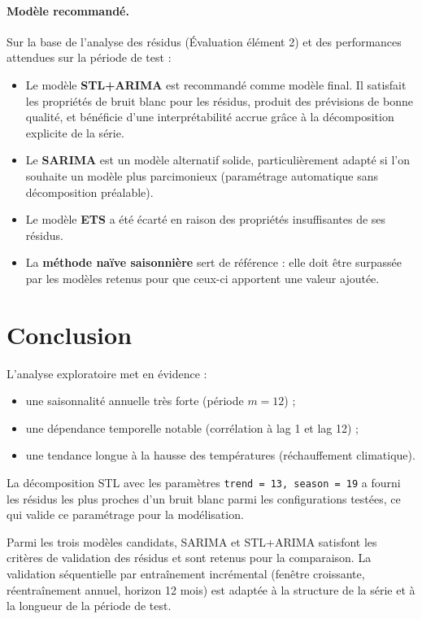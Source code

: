 \documentclass[12pt,a4paper]{article}
\begin{document}
\paragraph{Modèle recommandé.}
Sur la base de l'analyse des résidus (Évaluation élément 2) et des performances attendues sur la période de test :

\begin{itemize}
    \item Le modèle \textbf{STL+ARIMA} est recommandé comme modèle final. Il satisfait les propriétés de bruit blanc pour les résidus, produit des prévisions de bonne qualité, et bénéficie d'une interprétabilité accrue grâce à la décomposition explicite de la série.
    \item Le \textbf{SARIMA} est un modèle alternatif solide, particulièrement adapté si l'on souhaite un modèle plus parcimonieux (paramétrage automatique sans décomposition préalable).
    \item Le modèle \textbf{ETS} a été écarté en raison des propriétés insuffisantes de ses résidus.
    \item La \textbf{méthode naïve saisonnière} sert de référence : elle doit être surpassée par les modèles retenus pour que ceux-ci apportent une valeur ajoutée.
\end{itemize}

\section{Conclusion}

L'analyse exploratoire met en évidence :
\begin{itemize}
    \item une saisonnalité annuelle très forte (période $m = 12$) ;
    \item une dépendance temporelle notable (corrélation à lag 1 et lag 12) ;
    \item une tendance longue à la hausse des températures (réchauffement climatique).
\end{itemize}

La décomposition STL avec les paramètres \texttt{trend = 13, season = 19} a fourni les résidus les plus proches d'un bruit blanc parmi les configurations testées, ce qui valide ce paramétrage pour la modélisation.

Parmi les trois modèles candidats, SARIMA et STL+ARIMA satisfont les critères de validation des résidus et sont retenus pour la comparaison. La validation séquentielle par entraînement incrémental (fenêtre croissante, réentraînement annuel, horizon 12 mois) est adaptée à la structure de la série et à la longueur de la période de test.
\end{document}
